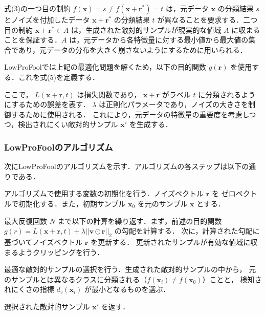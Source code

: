 式(3)の一つ目の制約 $f(\bm{x}) = s \neq f(\bm{x}+\bm{r}^*) = t$ は，元データ $\bm{x}$ の分類結果 $s$ とノイズを付加したデータ $\bm{x}+\bm{r}^*$ の分類結果 $t$ が異なることを要求する．二つ目の制約 $\bm{x}+\bm{r}^* \in A$ は，生成された敵対的サンプルが現実的な値域 $A$ に収まることを保証する．$A$ は，元データから各特徴量に対する最小値から最大値の集合であり，元データの分布を大きく崩さないようにするために用いられる．

LowProFoolでは上記の最適化問題を解くため，以下の目的関数 $g(\bm{r})$ を使用する．これを式(5)を定義する．


ここで， $L(\bm{x}+\bm{r}, t)$ は損失関数であり， $\bm{x}+\bm{r}$ がラベル $t$ に分類されるようにするための誤差を表す． $\lambda$ は正則化パラメータであり，ノイズの大きさを制御するために使用される．
これにより，元データの特徴量の重要度を考慮しつつ，検出されにくい敵対的サンプル $\bm{x}'$ を生成する．


\subsubsection{LowProFoolのアルゴリズム}
次にLowProFoolのアルゴリズムを示す．アルゴリズムの各ステップは以下の通りである．
\begin{algorithm_step}
    \item[Step 1)] アルゴリズムで使用する変数の初期化を行う．ノイズベクトル $\bm{r}$ を
        ゼロベクトルで初期化する．また，初期サンプル $\bm{x}_0$ を元のサンプル $\bm{x}$ とする．
    
    \item[Step 2)] 最大反復回数 $N$ まで以下の計算を繰り返す．まず，前述の目的関数 
        $g(r) = L(\bm{x}+\bm{r}, t) + \lambda ||\bm{v} \odot \bm{r}||_2$ の勾配を計算する．
        次に，計算された勾配に基づいてノイズベクトル $\bm{r}$ を更新する．
        更新されたサンプルが有効な値域に収まるようクリッピングを行う．
    
    \item[Step 3)] 最適な敵対的サンプルの選択を行う．生成された敵対的サンプルの中から，
        元のサンプルとは異なるクラスに分類される（$f(\bm{x}_i) \neq f(\bm{x}_0)$）ことと，
        検知されにくさの指標 $d_v(\bm{x}_i)$ が最小となるものを選ぶ．
    
    \item[Step 4)] 選択された敵対的サンプル $\bm{x}'$ を返す．
    \end{algorithm_step}



